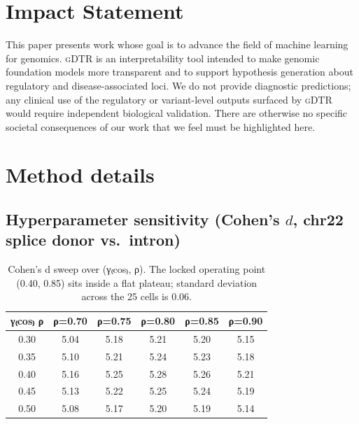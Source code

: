 \documentclass[12pt]{article}
\theoremstyle{plain}
\theoremstyle{definition}
\theoremstyle{remark}
\newcommand{\gDTR}{\textsc{gDTR}}
\begin{document}
\section*{Impact Statement}
This paper presents work whose goal is to advance the field of
machine learning for genomics. \gDTR{} is an interpretability tool
intended to make genomic foundation models more transparent and to
support hypothesis generation about regulatory and disease-associated
loci. We do not provide diagnostic predictions; any clinical use of
the regulatory or variant-level outputs surfaced by \gDTR{} would
require independent biological validation. There are otherwise no
specific societal consequences of our work that we feel must be
highlighted here.



\newpage
\appendix
\onecolumn

\section{Method details}
\label{app:method}

\subsection{Hyperparameter sensitivity (Cohen's $d$, chr22 splice donor vs.\ intron)}
\label{app:gamma-sweep}

\begin{table}[h]
\caption{Cohen's d sweep over (γ₍cos₎, ρ). The locked
operating point (0.40, 0.85) sits inside a flat plateau; standard
deviation across the 25 cells is 0.06.}
\label{tab:gamma-sweep}
\centering
\small
\begin{tabular}{@{}c|ccccc@{}}
\toprule
γ₍cos₎ ρ
   & ρ=0.70 & ρ=0.75 & ρ=0.80 & ρ=0.85 & ρ=0.90 \\
\midrule
0.30 & 5.04 & 5.18 & 5.21 & 5.20 & 5.15 \\
0.35 & 5.10 & 5.21 & 5.24 & 5.23 & 5.18 \\
0.40 & 5.16 & 5.25 & 5.28 & 5.26 & 5.21 \\
0.45 & 5.13 & 5.22 & 5.25 & 5.24 & 5.19 \\
0.50 & 5.08 & 5.17 & 5.20 & 5.19 & 5.14 \\
\bottomrule
\end{tabular}
\end{table}
\end{document}
